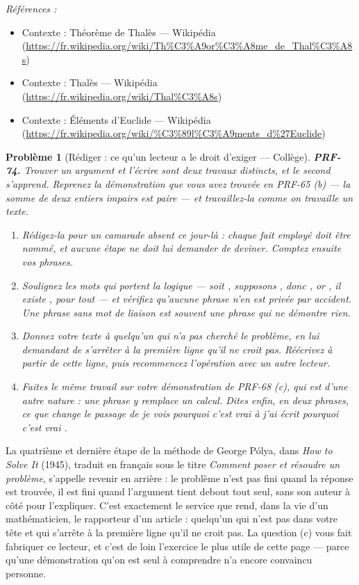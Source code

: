 \documentclass[11pt]{article}
\newtheorem{problem}{Problème}
\newenvironment{refs}{\par\small\noindent\emph{Références :}\begin{itemize}\setlength\itemsep{0pt}}{\end{itemize}\normalsize}
\begin{document}
\begin{refs}
\item Contexte : Théorème de Thalès --- Wikipédia (\url{https://fr.wikipedia.org/wiki/Th%C3%A9or%C3%A8me_de_Thal%C3%A8s})
\item Contexte : Thalès --- Wikipédia (\url{https://fr.wikipedia.org/wiki/Thal%C3%A8s})
\item Contexte : Éléments d'Euclide --- Wikipédia (\url{https://fr.wikipedia.org/wiki/%C3%89l%C3%A9ments_d%27Euclide})
\end{refs}

\bigskip

\begin{problem}[{Rédiger : ce qu'un lecteur a le droit d'exiger --- Collège}]
\textbf{PRF-74.} Trouver un argument et l'écrire sont deux travaux distincts, et le second
s'apprend. Reprenez la démonstration que vous avez trouvée en PRF-65 (b) --- la somme de deux
entiers impairs est paire --- et travaillez-la comme on travaille un texte.
\begin{enumerate}
\item[(a)] Rédigez-la pour un camarade absent ce jour-là : chaque fait employé doit être nommé, et
aucune étape ne doit lui demander de deviner. Comptez ensuite vos phrases.
\item[(b)] Soulignez les mots qui portent la logique --- \og{} soit \fg{}, \og{} supposons \fg{}, \og{} donc \fg{}, \og{} or \fg{},
\og{} il existe \fg{}, \og{} pour tout \fg{} --- et vérifiez qu'aucune phrase n'en est privée par accident.
Une phrase sans mot de liaison est souvent une phrase qui ne démontre rien.
\item[(c)] Donnez votre texte à quelqu'un qui n'a pas cherché le problème, en lui demandant de
s'arrêter à la première ligne qu'il ne croit pas. Réécrivez à partir de cette ligne, puis
recommencez l'opération avec un autre lecteur.
\item[(d)] Faites le même travail sur votre démonstration de PRF-68 (c), qui est d'une autre
nature : une phrase y remplace un calcul. Dites enfin, en deux phrases, ce que change le
passage de \og{} je vois pourquoi c'est vrai \fg{} à \og{} j'ai écrit pourquoi c'est vrai \fg{}.
\end{enumerate}

\end{problem}

\noindent La quatrième et dernière étape de la méthode de George Pólya, dans
\textit{How to Solve It} (1945), traduit en français sous le titre \textit{Comment poser et
résoudre un problème}, s'appelle \og{} revenir en arrière \fg{} : le problème n'est pas fini quand
la réponse est trouvée, il est fini quand l'argument tient debout tout seul, sans son auteur
à côté pour l'expliquer. C'est exactement le service que rend, dans la vie d'un
mathématicien, le rapporteur d'un article : quelqu'un qui n'est pas dans votre tête et qui
s'arrête à la première ligne qu'il ne croit pas. La question (c) vous fait fabriquer ce
lecteur, et c'est de loin l'exercice le plus utile de cette page --- parce qu'une démonstration
qu'on est seul à comprendre n'a encore convaincu personne.
\end{document}
